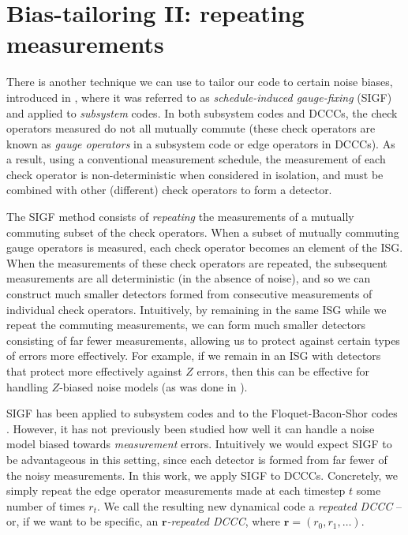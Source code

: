 \section{Bias-tailoring II: repeating measurements}\label{sec:gauge_dcccs}

There is another technique we can use to tailor our code to certain noise biases, introduced in , where it was referred to as \textit{schedule-induced gauge-fixing} (SIGF) and applied to \textit{subsystem} codes.
In both subsystem codes and DCCCs, the check operators measured do not all mutually commute (these check operators are known as \textit{gauge operators} in a subsystem code or edge operators in DCCCs).
As a result, using a conventional measurement schedule, the measurement of each check operator is non-deterministic when considered in isolation, and must be combined with other (different) check operators to form a detector.

The SIGF method consists of \textit{repeating} the measurements of a mutually commuting subset of the check operators.
When a subset of mutually commuting gauge operators is measured, each check operator becomes an element of the ISG.
When the measurements of these check operators are repeated, the subsequent measurements are all deterministic (in the absence of noise), and so we can construct much smaller detectors formed from consecutive measurements of individual check operators.
Intuitively, by remaining in the same ISG while we repeat the commuting measurements, we can form much smaller detectors consisting of far fewer measurements, allowing us to protect against certain types of errors more effectively.
For example, if we remain in an ISG with detectors that protect more effectively against $Z$ errors, then this can be effective for handling $Z$-biased noise models (as was done in ).

SIGF has been applied to subsystem codes  and to the Floquet-Bacon-Shor codes .
However, it has not previously been studied how well it can handle a noise model biased towards \textit{measurement} errors.
Intuitively we would expect SIGF to be advantageous in this setting, since each detector is formed from far fewer of the noisy measurements.
In this work, we apply SIGF to DCCCs.
Concretely, we simply repeat the edge operator measurements made at each timestep $t$ some number of times $r_t$.
We call the resulting new dynamical code a \textit{repeated DCCC} --
or, if we want to be specific, an \emph{$\mathbf{r}$-repeated DCCC}, where $\mathbf{r} = (r_0, r_1, \ldots)$.

